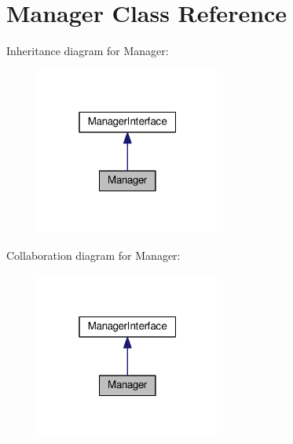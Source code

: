 \hypertarget{classManager}{}\section{Manager Class Reference}
\label{classManager}


Inheritance diagram for Manager\+:
\nopagebreak
\begin{figure}[H]
\begin{center}
\leavevmode
\includegraphics[width=172pt]{classManager__inherit__graph}
\end{center}
\end{figure}


Collaboration diagram for Manager\+:
\nopagebreak
\begin{figure}[H]
\begin{center}
\leavevmode
\includegraphics[width=172pt]{classManager__coll__graph}
\end{center}
\end{figure}
